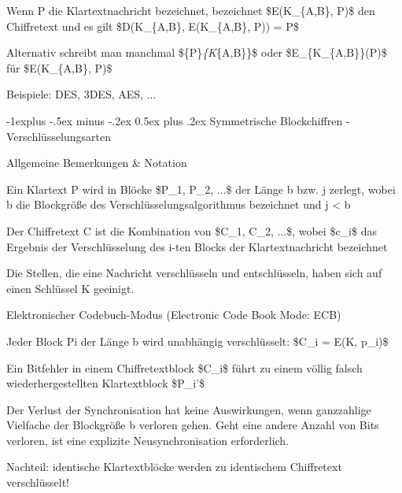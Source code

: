 \documentclass[a4paper]{article}
\makeatletter
\renewcommand{\subsection}{\@startsection{subsection}{2}{0mm}%
 {-1explus -.5ex minus -.2ex}%
 {0.5ex plus .2ex}%
 {\normalfont\normalsize\bfseries}}
\makeatother
\begin{document}
\begin{multicols}{3}
\begin{itemize*}
            \begin{itemize*}
                  \item Wenn P die Klartextnachricht bezeichnet, bezeichnet \$E(K\_\{A,B\}, P)\$ den Chiffretext und es gilt \$D(K\_\{A,B\}, E(K\_\{A,B\}, P)) = P\$
                  \item Alternativ schreibt man manchmal \$\{P\}\emph{\{K}\{A,B\}\}\$ oder \$E\_\{K\_\{A,B\}\}(P)\$ für \$E(K\_\{A,B\}, P)\$
            \end{itemize*}
            \item
            Beispiele: DES, 3DES, AES, ...
      \end{itemize*}


      \subsection{Symmetrische Blockchiffren -
            Verschlüsselungsarten}

      Allgemeine Bemerkungen \& Notation

      \begin{itemize*}
            \item
            Ein Klartext P wird in Blöcke \$P\_1, P\_2, ...\$ der Länge b bzw. j
            zerlegt, wobei b die Blockgröße des Verschlüsselungsalgorithmus
            bezeichnet und j \textless{} b
            \item
            Der Chiffretext C ist die Kombination von \$C\_1, C\_2, ...\$, wobei
            \$c\_i\$ das Ergebnis der Verschlüsselung des i-ten Blocks der
            Klartextnachricht bezeichnet
            \item
            Die Stellen, die eine Nachricht verschlüsseln und entschlüsseln, haben
            sich auf einen Schlüssel K geeinigt.
      \end{itemize*}

      Elektronischer Codebuch-Modus (Electronic Code Book Mode: ECB)

      \begin{itemize*}
            \item
            Jeder Block Pi der Länge b wird unabhängig verschlüsselt: \$C\_i =
            E(K, p\_i)\$
            \item
            Ein Bitfehler in einem Chiffretextblock \$C\_i\$ führt zu einem völlig
            falsch wiederhergestellten Klartextblock \$P\_i'\$
            \item
            Der Verlust der Synchronisation hat keine Auswirkungen, wenn
            ganzzahlige Vielfache der Blockgröße b verloren gehen. Geht eine
            andere Anzahl von Bits verloren, ist eine explizite Neusynchronisation
            erforderlich.
            \item
            Nachteil: identische Klartextblöcke werden zu identischem Chiffretext
            verschlüsselt!
      \end{itemize*}


\end{multicols}
\end{document}
